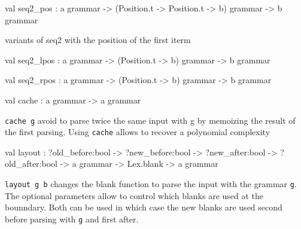 \documentclass[11pt]{article}
\begin{document}
\label{val:Grammar.seq2-underscorepos}\begin{ocamldoccode}
val seq2_pos :
  {\textquotesingle}a grammar ->
  (Position.t -> Position.t -> {\textquotesingle}b) grammar -> {\textquotesingle}b grammar
\end{ocamldoccode}
\begin{ocamldocdescription}
variants of seq2 with the position of the first iterm


\end{ocamldocdescription}




\label{val:Grammar.seq2-underscorelpos}\begin{ocamldoccode}
val seq2_lpos : {\textquotesingle}a grammar ->
  (Position.t -> {\textquotesingle}b) grammar -> {\textquotesingle}b grammar
\end{ocamldoccode}




\label{val:Grammar.seq2-underscorerpos}\begin{ocamldoccode}
val seq2_rpos : {\textquotesingle}a grammar ->
  (Position.t -> {\textquotesingle}b) grammar -> {\textquotesingle}b grammar
\end{ocamldoccode}




\label{val:Grammar.cache}\begin{ocamldoccode}
val cache : {\textquotesingle}a grammar -> {\textquotesingle}a grammar
\end{ocamldoccode}
\begin{ocamldocdescription}
{\tt{cache g}} avoid to parse twice the same input with g by memoizing the result
    of the first parsing. Using {\tt{cache}} allows to recover a polynomial complexity


\end{ocamldocdescription}




\label{val:Grammar.layout}\begin{ocamldoccode}
val layout :
  ?old_before:bool ->
  ?new_before:bool ->
  ?new_after:bool ->
  ?old_after:bool -> {\textquotesingle}a grammar -> Lex.blank -> {\textquotesingle}a grammar
\end{ocamldoccode}
\begin{ocamldocdescription}
{\tt{layout g b}} changes the blank function to parse the input with the
    grammar {\tt{g}}. The optional parameters allow to control which blanks are used
    at the bounndary. Both can be used in which case the new blanks are used
    second before parsing with {\tt{g}} and first after.


\end{ocamldocdescription}
\end{document}
